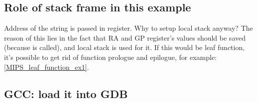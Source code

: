 \subsection{Role of stack frame in this example}

Address of the string is passed in register. 
Why to setup local stack anyway?
The reason of this lies in the fact that \ac{RA} and GP register's values should be saved (because \printf
is called), and local stack is used for it.
If this would be \gls{leaf function}, it's possible to get rid of function prologue and epilogue,
for example: \ref{MIPS_leaf_function_ex1}.

\subsection{\Optimizing GCC: load it into GDB}



\fi
